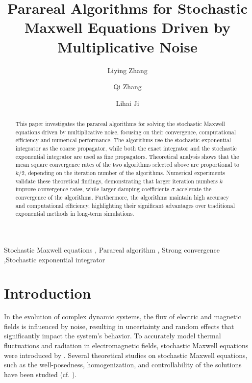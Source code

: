 \documentclass[preprint,12pt]{elsarticle}
\begin{document}
	\begin{frontmatter}
		\title{Parareal Algorithms for Stochastic Maxwell Equations Driven by Multiplicative Noise}
		\author[1]{Liying Zhang}
		\author[1]{Qi Zhang}
		\author[b,c]{Lihai Ji} 
		\address[1]{School of Mathematical Science, China University of Mining and Technology, Beijing 100083, China}
		\address[b]{Institute of Applied Physics and Computational Mathematics, Beijing 100094, China}
		\address[c]{Shanghai Zhangjiang Institute of Mathematics, Shanghai 201203, China}
		
		
		\begin{abstract}
			This paper investigates the parareal algorithms for solving the stochastic Maxwell equations driven by multiplicative noise, focusing on their convergence, computational efficiency and numerical performance. The algorithms use the stochastic exponential integrator as the coarse propagator, while both the exact integrator and the stochastic exponential integrator are used as fine propagators. Theoretical analysis shows that the mean square convergence rates of the two algorithms selected above are proportional to \(k/2\), depending on the iteration number of the algorithms. Numerical experiments validate these theoretical findings, demonstrating that larger iteration numbers \(k\) improve convergence rates, while larger damping coefficients \(\sigma\) accelerate the convergence of the algorithms. Furthermore, the algorithms maintain high accuracy and computational efficiency, highlighting their significant advantages over traditional exponential methods in long-term simulations.
		\end{abstract}
		\begin{keyword}
			Stochastic Maxwell equations \sep
			Parareal algorithm \sep
			Strong convergence \sep Stochastic exponential integrator
		\end{keyword}
		
	\end{frontmatter}
	
	\section{Introduction}\label{sec1}
	In the evolution of complex dynamic systems, the flux of electric and magnetic fields is influenced by noise, resulting in uncertainty and random effects that significantly impact the system's behavior. To accurately model thermal fluctuations and radiation in electromagnetic fields, stochastic Maxwell equations were introduced by \citep{Rytovetal1989}. Several theoretical studies on stochastic Maxwell equations, such as the well-posedness, homogenization, and controllability of the solutions have been studied (cf. \citep{Liaskosetal2010,Horsinetal2010,Roachetal2012}). 
	
\end{document}
